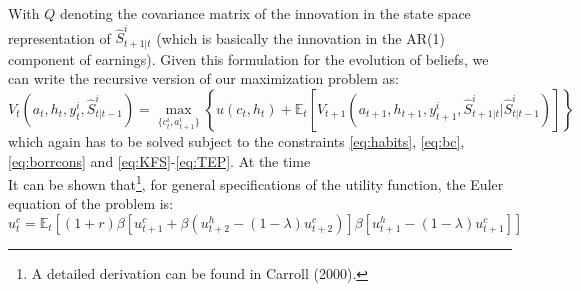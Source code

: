 With $Q$ denoting the covariance matrix of the innovation in the state space representation of $\hat{S}_{t+1|t}^i$ (which is basically the innovation in the AR(1) component of earnings). 
Given this formulation for the evolution of beliefs, we can write the recursive version of our maximization problem as:
\begin{equation} \label{eq:bellman}
V_t(a_t,h_t,y_t^i,\hat{S}^i_{t|t-1}) = \max_{\{c_t^i, a_{t+1}^i\}} \left\{ u(c_t,h_t) + \mathbb{E}_t \left[ V_{t+1}(a_{t+1},h_{t+1},y_{t+1}^i,\hat{S}^i_{t+1|t}|\hat{S}^i_{t|t-1}) \right] \right\}
\end{equation}
which again has to be solved subject to the constraints \ref{eq:habits}, \ref{eq:bc}, \ref{eq:borrcons} and \ref{eq:KFS}-\ref{eq:TEP}. At the time  \\
It can be shown that\footnote{A detailed derivation can be found in Carroll (2000).}, for general specifications of the utility function, the Euler equation of the problem is:
\begin{equation*}
u_t^c = \mathbb{E}_t \left[ (1+r) \beta \left[ u_{t+1}^c + \beta (u_{t+2}^h - (1-\lambda)u_{t+2}^c ) \right] \beta \left[u_{t+1}^h - (1-\lambda)u_{t+1}^c \right] \right]
\end{equation*}
